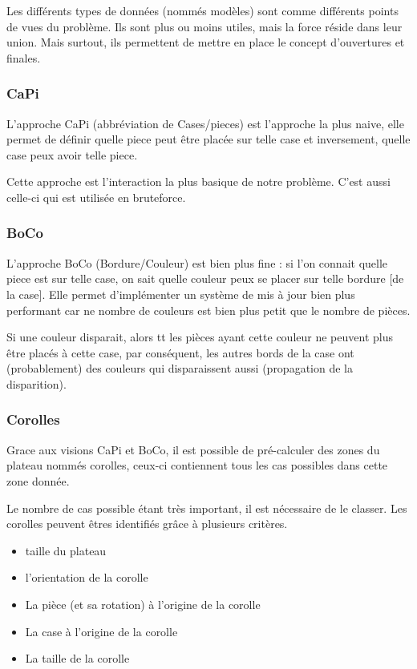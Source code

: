 \documentclass{article}
\begin{document}
	Les différents types de données (nommés modèles) sont comme différents points de vues du problème. Ils sont plus ou moins utiles, mais la force réside dans leur union. Mais surtout, ils permettent de mettre en place le concept d'ouvertures et finales.
	
	\subsubsection{CaPi}
	
	L'approche CaPi (abbréviation de Cases/pieces) est l'approche la plus naive, elle permet de définir quelle piece peut être placée sur telle case et inversement, quelle case peux avoir telle piece.
	
	Cette approche est l'interaction la plus basique de notre problème. C'est aussi celle-ci qui est utilisée en bruteforce.
	
	\subsubsection{BoCo}
	
	L'approche BoCo (Bordure/Couleur) est bien plus fine : si l'on connait quelle piece est sur telle case, on sait quelle couleur peux se placer sur telle bordure [de la case]. Elle permet d'implémenter un système de mis à jour bien plus performant car ne nombre de couleurs est bien plus petit que le nombre de pièces. 
	
	\begin{exmp}
		Si une couleur disparait, alors tt les pièces ayant cette couleur ne peuvent plus être placés à cette case, par conséquent, les autres bords de la case ont (probablement) des couleurs qui disparaissent aussi (propagation de la disparition).
	\end{exmp}
	
	\subsubsection{Corolles}
	
	Grace aux visions CaPi et BoCo, il est possible de pré-calculer des zones du plateau nommés corolles, ceux-ci contiennent tous les cas possibles dans cette zone donnée.
	
	Le nombre de cas possible étant très important, il est nécessaire de le classer. Les corolles peuvent êtres identifiés grâce à plusieurs critères.
	
	\begin{itemize}
		\item taille du plateau
		\item l'orientation de la corolle
		\item La pièce (et sa rotation) à l'origine de la corolle
		\item La case à l'origine de la corolle
		\item La taille de la corolle
	\end{itemize}
	
\end{document}
